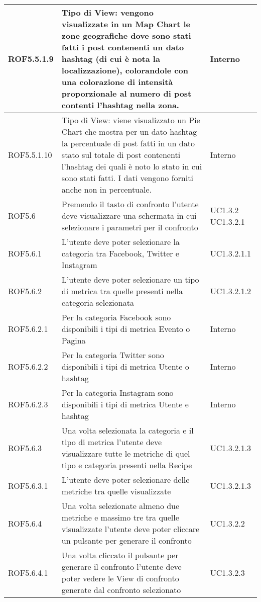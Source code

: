 \begin{center}
\begin{longtable}{| p{2.5cm} | p{8cm} | p{2cm} |}
		\hline
		ROF5.5.1.9  &  Tipo di View: vengono visualizzate in un Map Chart le zone geografiche dove sono stati fatti i post contenenti un dato hashtag (di cui è nota la localizzazione), colorandole con una colorazione di intensità proporzionale al numero di post contenti l'hashtag nella zona. & Interno \\
		\hline
		ROF5.5.1.10  &  Tipo di View: viene visualizzato un Pie Chart che mostra per un dato hashtag la percentuale di post fatti in un dato stato sul totale di post contenenti l'hashtag dei quali è noto lo stato in cui sono stati fatti. I dati vengono forniti anche non in percentuale. & Interno \\
		\hline


		ROF5.6  &  Premendo il tasto di confronto l'utente deve visualizzare una schermata in cui selezionare i parametri per il confronto  &  UC1.3.2 \newline UC1.3.2.1 \\
		\hline
		ROF5.6.1  &  L'utente deve poter selezionare la categoria tra Facebook, Twitter e Instagram  &  UC1.3.2.1.1 \\
		\hline
		ROF5.6.2  &  L'utente deve poter selezionare un tipo di metrica tra quelle presenti nella categoria selezionata  &  UC1.3.2.1.2 \\
		\hline
		ROF5.6.2.1  &  Per la categoria Facebook sono disponibili i tipi di metrica Evento o Pagina  &  Interno \\
		\hline
		ROF5.6.2.2  &  Per la categoria Twitter sono disponibili i tipi di metrica Utente o hashtag &  Interno \\
		\hline
		ROF5.6.2.3  &  Per la categoria Instagram sono disponibili i tipi di metrica Utente e hashtag   &  Interno \\
		\hline
		ROF5.6.3  &  Una volta selezionata la categoria e il tipo di metrica l'utente deve visualizzare tutte le metriche di quel tipo e categoria presenti nella Recipe &  UC1.3.2.1.3 \\
		\hline
		ROF5.6.3.1  &  L'utente deve poter selezionare delle metriche tra quelle visualizzate &  UC1.3.2.1.3 \\
		\hline
		ROF5.6.4  &  Una volta selezionate almeno due metriche e massimo tre tra quelle visualizzate l'utente deve poter cliccare un pulsante per generare il confronto  &  UC1.3.2.2 \\
		\hline
		ROF5.6.4.1  &  Una volta cliccato il pulsante per generare il confronto l'utente deve poter vedere le View di confronto generate dal confronto selezionato  &  UC1.3.2.3 \\

\end{longtable}
\end{center}
